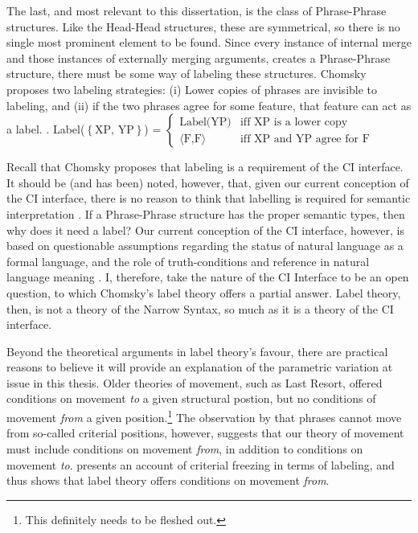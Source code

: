 \documentclass[letterpaper,12pt]{article}
\newcommand{\xpyp}{$\left\{ \text{XP, YP} \right\}$}
\begin{document}
The last, and most relevant to this dissertation, is the class of Phrase-Phrase structures.
Like the Head-Head structures, these are symmetrical, so there is no single most prominent element to be found.
Since every instance of internal merge and those instances of externally merging arguments, creates a Phrase-Phrase structure, there must be some way of labeling these structures.
Chomsky proposes two labeling strategies: (i) Lower copies of phrases are invisible to labeling, and (ii) if the two phrases agree for some feature, that feature can act as a label.
\ex. Label(\xpyp) = $
\begin{cases}
  \text{Label(YP)} & \text{iff XP is a lower copy}\\
  \langle\text{F,F}\rangle & \text{iff XP and YP agree for F}
\end{cases}
$

Recall that Chomsky proposes that labeling is a requirement of the CI interface.
It should be (and has been) noted, however, that, given our current conception of the CI interface, there is no reason to think that labelling is required for semantic interpretation \parencite[see \textit{e.g.,}][]{hornstein2016arizona}.
If a Phrase-Phrase structure has the proper semantic types, then why does it need a label?
Our current conception of the CI interface, however, is based on questionable assumptions regarding the status of natural language as a formal language, and the role of truth-conditions and reference in natural language meaning \parencite{chomsky2000new,pietroski2005events,moravcsik1998meaning}.
I, therefore, take the nature of the CI Interface to be an open question, to which Chomsky's label theory offers a partial answer.
Label theory, then, is not a theory of the Narrow Syntax, so much as it is a theory of the CI interface.

Beyond the theoretical arguments in label theory's favour, there are practical reasons to believe it will provide an explanation of the parametric variation at issue in this thesis.
Older theories of movement, such as Last Resort, offered conditions on movement \textit{to} a given structural postion, but no conditions of movement \textit{from} a given position.\footnote{This definitely needs to be fleshed out.}
The observation by \textcite[][and elsewhere]{rizzi2015notes} that phrases cannot move from so-called criterial positions, however, suggests that our theory of movement must include conditions on movement \textit{from}, in addition to conditions on movement \textit{to}.
\textcite{chomsky2015problems} presents an account of criterial freezing in terms of labeling, and thus shows that label theory offers conditions on movement \textit{from}.
\end{document}
